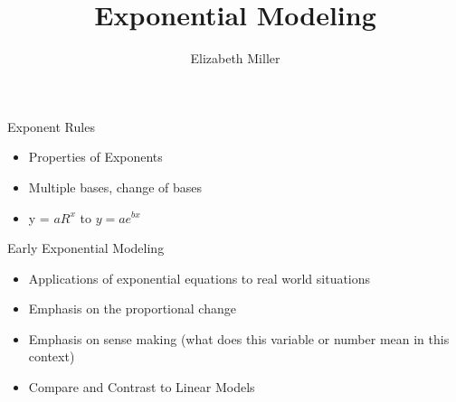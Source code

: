 \documentclass{ximera}
\author{Elizabeth Miller}
\title{Exponential Modeling}
\begin{document}
\begin{abstract}
\end{abstract}
\maketitle


\begin{objectives}

\item Exponent Rules 
\begin{itemize}
	\item Properties of Exponents 
	\item Multiple bases, change of bases  
	\item y = $aR^{x}$ to $y = ae^{bx}$ 
\end{itemize}

\item Early Exponential Modeling
\begin{itemize}
	\item Applications of exponential equations to real world situations 
	\item Emphasis on the proportional change   
	\item Emphasis on sense making (what does this variable or number mean in this context) 
	\item Compare and Contrast to Linear Models 
\end{itemize}


\end{objectives}
\end{document}
